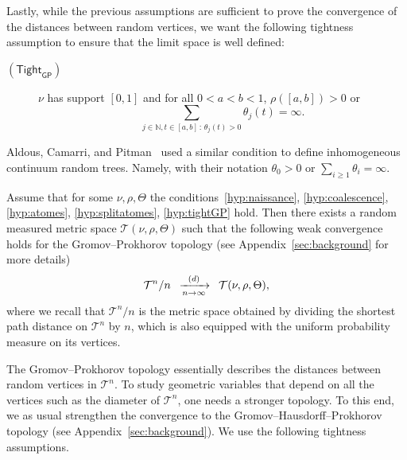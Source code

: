 \documentclass[AHL,Unicode,published]{cedram}
\makeatletter
\newcommand{\optionaldesc}[2]{
\phantomsection #1\protected@edef\@currentlabel{#1}\label{#2}
}
\newcommand{\cvloi}[1][n]{\enskip\xrightarrow[#1 \to \infty]{(d)}\enskip}
\newcommand{\N}{\mathbb{N}}
\newcommand{\1}{\mathbbm{1}}
\newcommand{\T}{\mathcal{T}}
\newcommand{\sTight}{\mathsf{Tight}}
\newcommand{\sGP}{\mathsf{GP}}
\renewcommand*{\to}{\mathchoice{\longrightarrow}{\rightarrow}{\rightarrow}{\rightarrow}}
\makeatother
\begin{document}
Lastly, while the previous assumptions are sufficient to prove the convergence of the distances between random vertices, we want the following tightness assumption to ensure that the limit space is well defined:
\smallskip
\begin{mdframed}[linecolor=black!60]
\begin{description}
\item[\textcolor{link}{\optionaldesc{$(\sTight_{\sGP})$}{hyp:tightGP}}] $\nu$ has support $[0,1]$ and for all $0<a<b<1$, $\rho([a,b])>0$ or
\[
\sum_{j\in \N,t\in [a,b]\,:\,\theta_{j}(t)>0} \theta_j(t)=\infty.
\]
\end{description}
\end{mdframed}
\begin{rema}
Aldous, Camarri, and Pitman~\cite{introICRT1,introICRT2} used a similar condition to define inhomogeneous continuum random trees. Namely, with their notation $\theta_0>0$ or $\sum_{i\geq 1} \theta_i=\infty$.
\end{rema}


\begin{theo}\label{th:GP}
Assume that for some $\nu, \rho,\Theta$ the conditions~\ref{hyp:naissance}, \ref{hyp:coalescence}, \ref{hyp:atomes}, \ref{hyp:splitatomes}, \ref{hyp:tightGP} hold. Then there exists a random measured metric space $\T(\nu,\rho,\Theta)$ such that the following weak convergence holds for the Gromov--Prokhorov topology (see Appendix~\ref{sec:background} for more details)
\[
\T^n/n \cvloi \T(\nu,\rho,\Theta),
\]
{where we recall that $\T^n/n$ is the metric space obtained by dividing the shortest path distance on $\T^n$ by $n$, which is also equipped} with the uniform probability measure on its vertices.
\end{theo}

The Gromov--Prokhorov topology essentially describes the distances between random vertices in $\T^n$. To study geometric variables that depend on all the vertices such as the diameter of $\T^n$, one needs a stronger topology. To this end, we as usual strengthen the convergence to the Gromov--Hausdorff--Prokhorov topology (see Appendix~\ref{sec:background}). We use the following tightness assumptions.
\end{document}
